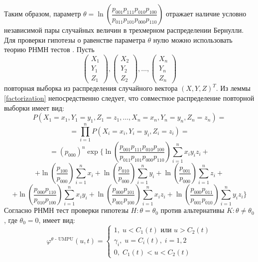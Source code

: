     Таким образом, параметр $\theta = \ln  \left(\dfrac{p_{001}p_{111}p_{010}p_{100}}{p_{011}p_{101}p_{000}p_{110}}\right)$ отражает наличие условно независимой пары
    случайных величин в трехмерном распределении Бернулли.
    Для проверки гипотезы о равенстве параметра $\theta$ нулю можно использовать 
    теорию РНМН тестов \cite{Lehmann1986}. Пусть
    $$
        \begin{pmatrix}
            X_1 \\
            Y_1 \\
            Z_1
        \end{pmatrix},
        \begin{pmatrix}
            X_2 \\
            Y_2 \\
            Z_2
        \end{pmatrix}, \ldots,
        \begin{pmatrix}
            X_n \\
            Y_n \\
            Z_n
        \end{pmatrix}
    $$ повторная выборка из распределения случайного вектора $(X,Y,Z)^T$.
    Из леммы \ref{factorization} непосредственно следует, что совместное распределение повторной выборки имеет вид:
    $$
    P(X_1=x_1,Y_1=y_1,Z_1=z_1,\ldots,X_n=x_n,Y_n=y_n,Z_n=z_n)=
    $$
    $$
    =\prod_{i=1}^n P(X_i=x_i,Y_i=y_i,Z_i=z_i) =
    $$
    $$
     =(p_{000})^n
            \exp \Biggl\{ \ln  \left(\dfrac{p_{001}p_{111}p_{010}p_{100}}{p_{011}p_{101}p_{000}p_{110}}\right) \sum_{i=1}^n x_i y_i z_i +$$
        $$ +
            \ln\left(\dfrac{p_{100}}{p_{000}}\right) \sum_{i=1}^{n} x_i + \ln\left(\dfrac{p_{010}}{p_{000}}\right) \sum_{i=1}^{n} y_i +
            \ln\left(\dfrac{p_{001}}{p_{000}}\right) \sum_{i=1}^{n} z_i +
        $$
        $$
            +\ln \left(\dfrac{p_{000}p_{110}}{p_{010}p_{100}}\right) \sum_{i=1}^n x_i y_i +
            \ln \left(\dfrac{p_{000}p_{101}}{p_{001}p_{100}}\right) \sum_{i=1}^n x_i z_i +
            \ln \left(\dfrac{p_{000}p_{011}}{p_{001}p_{010}}\right) \sum_{i=1}^n y_i z_i \Biggr\}
        $$
    Согласно \cite{Lehmann1986} РНМН тест проверки гипотезы $H: \theta = \theta_0$ против альтернативы $K: \theta \neq \theta_0$, где $\theta_0=0$, имеет вид:
    $$
    \varphi^{\text{$\theta$ - UMPU}}(u,t)=\begin{cases}
        1, \; u<C_1(t) \text{ или } u>C_2(t)\\
        \gamma_i, \; u=C_i(t), \; i=1,2\\
        0, \; C_1(t)<u<C_2(t)
    \end{cases}
    $$
